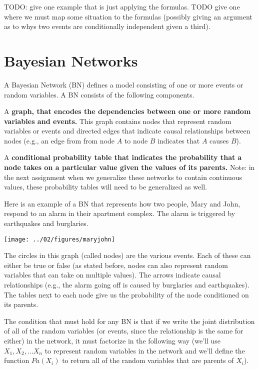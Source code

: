 \documentclass{tufte-handout}
\begin{document}
\begin{exercise}
TODO: give one example that is just applying the formulas.  TODO give one where we must map some situation to the formulas (possibly giving an argument as to whys two events are conditionally independent given a third).
\end{exercise}

\section{Bayesian Networks}

A Bayesian Network (BN) defines a model consisting of one or more events or random variables.  A BN consists of the following components.
\bi
\item A \textbf{graph, that encodes the dependencies between one or more random variables and events.}  This graph contains nodes that represent random variables or events and directed edges that indicate causal relationships between nodes (e.g., an edge from from node $A$ to node $B$ indicates that $A$ causes $B$).
\item A \textbf{conditional probability table that indicates the probability that a node takes on a particular value given the values of its parents.}  Note: in the next assignment when we generalize these networks to contain continuous values, these probability tables will need to be generalized as well.
\ei

Here is an example of a BN that represents how two people, Mary and John, respond to an alarm in their apartment complex.  The alarm is triggered by earthquakes and burglaries.

\begin{center}
\texttt{[image: ../02/figures/maryjohn]}
\end{center}

The circles in this graph (called nodes) are the various events.  Each of these can either be true or false (as stated before, nodes can also represent random variables that can take on multiple values).  The arrows indicate causal relationships (e.g., the alarm going off is caused by burglaries and earthquakes).  The tables next to each node give us the probability of the node conditioned on its parents.

 The condition that must hold for any BN is that if we write the joint distribution of all of the random variables (or events, since the relationship is the same for either) in the network, it must factorize in the following way (we'll use $X_1, X_2, \ldots X_n$ to represent random variables in the network and we'll define the function $Pa(X_i)$ to return all of the random variables that are parents of $X_i$).
\end{document}
